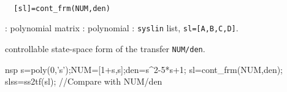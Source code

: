 \begin{mandesc}
   \\ %
\end{mandesc}
\begin{calling_sequence}
\begin{verbatim}
  [sl]=cont_frm(NUM,den)  
\end{verbatim}
\end{calling_sequence}
\begin{parameters}
  \begin{varlist}
    : polynomial matrix
    : polynomial
    : \verb!syslin! list, \verb!sl=[A,B,C,D]!.
  \end{varlist}
\end{parameters}
\begin{mandescription}
  controllable state-space form of the transfer \verb!NUM/den!.
\end{mandescription}
\begin{examples}
  \begin{mintednsp}{nsp}
    s=poly(0,'s');NUM=[1+s,s];den=s^2-5*s+1;
    sl=cont_frm(NUM,den); 
    slss=ss2tf(sl);       //Compare with NUM/den
  \end{mintednsp}
\end{examples}
\begin{manseealso}
      
\end{manseealso}
